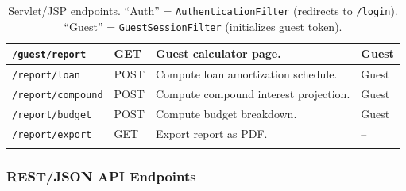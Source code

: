 \begin{longtable}{|p{}|p{} |p{}|p{}|}
\texttt{/guest/report} & GET & Guest calculator page. & Guest \\\hline
\texttt{/report/loan} & POST & Compute loan amortization schedule. & Guest \\\hline
\texttt{/report/compound} & POST & Compute compound interest projection. & Guest \\\hline
\texttt{/report/budget} & POST & Compute budget breakdown. & Guest \\\hline
\texttt{/report/export} & GET & Export report as PDF. & -- \\\hline

\caption{Servlet/JSP endpoints. ``Auth'' = \texttt{AuthenticationFilter} (redirects to \texttt{/login}). ``Guest'' = \texttt{GuestSessionFilter} (initializes guest token).}
\label{tab:servletEndpoints}
\end{longtable}

\subsubsection*{REST/JSON API Endpoints}

